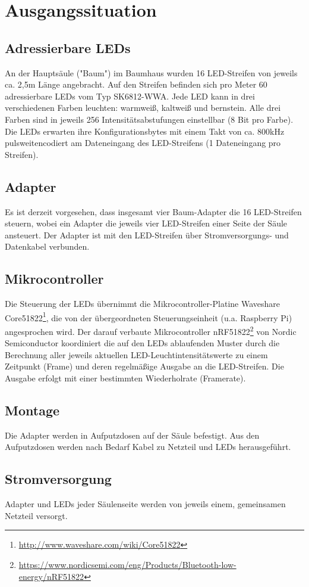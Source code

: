 
\section{Ausgangssituation}

\subsection{Adressierbare LEDs}
An der Haupts\"aule ("Baum") im Baumhaus wurden
16 LED-Streifen
von jeweils ca. 2,5m L\"ange angebracht.
Auf den Streifen befinden sich pro Meter
60 adressierbare LEDs vom Typ SK6812-WWA.
Jede LED kann in drei verschiedenen Farben leuchten:
warmwei{\ss}, kaltwei{\ss} und bernstein.
Alle drei Farben sind in jeweils
256 Intensit\"atsabstufungen einstellbar (8 Bit pro Farbe).
Die LEDs erwarten ihre Konfigurationsbytes
mit einem Takt von ca. 800kHz
pulsweitencodiert
am Dateneingang des LED-Streifens
(1 Dateneingang pro Streifen).

\subsection{Adapter}
Es ist derzeit vorgesehen,
dass insgesamt vier Baum-Adapter
die 16 LED-Streifen steuern,
wobei ein Adapter die jeweils vier LED-Streifen
einer Seite der S\"aule ansteuert.
Der Adapter ist mit den LED-Streifen
\"uber Stromversorgungs- und Datenkabel verbunden.

\subsection{Mikrocontroller}
Die Steuerung der LEDs \"ubernimmt die
Mikrocontroller-Platine
Waveshare Core51822\footnote{\url{http://www.waveshare.com/wiki/Core51822}},
die von der \"ubergeordneten Steuerungseinheit
(u.a. Raspberry Pi)
angesprochen wird.
Der darauf verbaute Mikrocontroller
nRF51822\footnote{\url{https://www.nordicsemi.com/eng/Products/Bluetooth-low-energy/nRF51822}}
von Nordic Semiconductor
koordiniert die auf den LEDs ablaufenden Muster
durch die Berechnung aller jeweils aktuellen
LED-Leuchtintensit\"atswerte zu einem Zeitpunkt (Frame)
und deren regelm\"a{\ss}ige Ausgabe an die LED-Streifen.
Die Ausgabe erfolgt
mit einer bestimmten Wiederholrate (Framerate).

\subsection{Montage}
Die Adapter werden in Aufputzdosen
auf der S\"aule befestigt.
Aus den Aufputzdosen werden nach Bedarf
Kabel zu Netzteil und LEDs herausgef\"uhrt.

\subsection{Stromversorgung}
Adapter und LEDs jeder S\"aulenseite
werden von jeweils einem, gemeinsamen
Netzteil versorgt.

